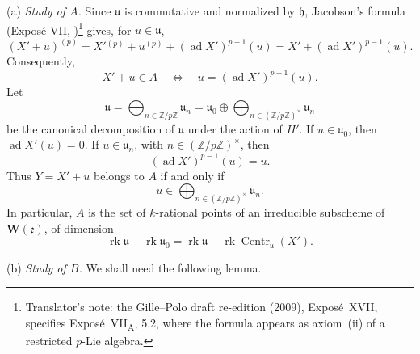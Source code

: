 \smallskip
\noindent
(a) \emph{Study of \(A\).}
Since \(\mathfrak u\) is commutative and normalized by
\(\mathfrak h\), Jacobson's formula (Exposé VII,
)\footnote{Translator's note: the Gille--Polo draft re-edition (2009),
Exposé~XVII, specifies Exposé~VII\textsubscript{A}, 5.2, where the formula appears
as axiom~(ii) of a restricted \(p\)-Lie algebra.} gives, for \(u\in\mathfrak u\),
\[
  (X'+u)^{(p)}
   =X'{}^{(p)}+u^{(p)}
      +(\operatorname{ad}X')^{p-1}(u)
   =X'+(\operatorname{ad}X')^{p-1}(u).
\]
Consequently,
\[
  X'+u\in A
  \quad\Longleftrightarrow\quad
  u=(\operatorname{ad}X')^{p-1}(u).
\]
Let
\[
  \mathfrak u
   =\bigoplus_{n\in\mathbb Z/p\mathbb Z}\mathfrak u_n
   =\mathfrak u_0\oplus
      \bigoplus_{n\in(\mathbb Z/p\mathbb Z)^\times}\mathfrak u_n
\]
be the canonical decomposition of \(\mathfrak u\) under the action
of \(H'\).  If \(u\in\mathfrak u_0\), then
\(\operatorname{ad}X'(u)=0\).  If
\(u\in\mathfrak u_n\), with
\(n\in(\mathbb Z/p\mathbb Z)^\times\), then
\[
  (\operatorname{ad}X')^{p-1}(u)=u.
\]
Thus \(Y=X'+u\) belongs to \(A\) if and only if
\[
  u\in
  \bigoplus_{n\in(\mathbb Z/p\mathbb Z)^\times}\mathfrak u_n.
\]
In particular, \(A\) is the set of \(k\)-rational points of an
irreducible subscheme of \(\mathbf W(\mathfrak e)\), of dimension
\[
  \operatorname{rk}\mathfrak u-\operatorname{rk}\mathfrak u_0
  =
  \operatorname{rk}\mathfrak u
  -\operatorname{rk}\operatorname{Centr}_{\mathfrak u}(X').
\]

\smallskip
\noindent
(b) \emph{Study of \(B\).}
We shall need the following lemma.


